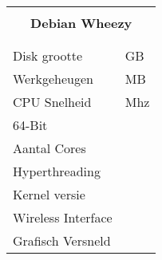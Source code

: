 \documentclass[a4paper,14pt]{extarticle}
\begin{document}

\begin{center}
	\begin{tabular}{ p{8cm}| p{8cm} }
		\multicolumn{2}{c}{\Huge\bf{\textsc{\hostname{}}}} \\
	\multicolumn{2}{c}{\Large\bf{Debian Wheezy \debianversion}}\\
	\multicolumn{2}{l}{\Large{\cpumodel{}}}  \\
	\multicolumn{2}{l}{\Large{\graphics{}}}  \\
	\hline
	\Large{Disk grootte} & \Large{\disksize{} GB}  \\
	\Large{Werkgeheugen} & \Large{\memsize{} MB} \\
	CPU Snelheid & \cpuspeed{} Mhz \\
	64-Bit & \bitssixtyfour{} \\
	Aantal Cores & \corecount{} \\
	Hyperthreading & \hyperthreading{} \\
	Kernel versie & {} \\
	Wireless Interface & \wireless \\
	Grafisch Versneld & \accelerated{} \\
	\hline
\end{tabular}
\end{center}
\end{document}
